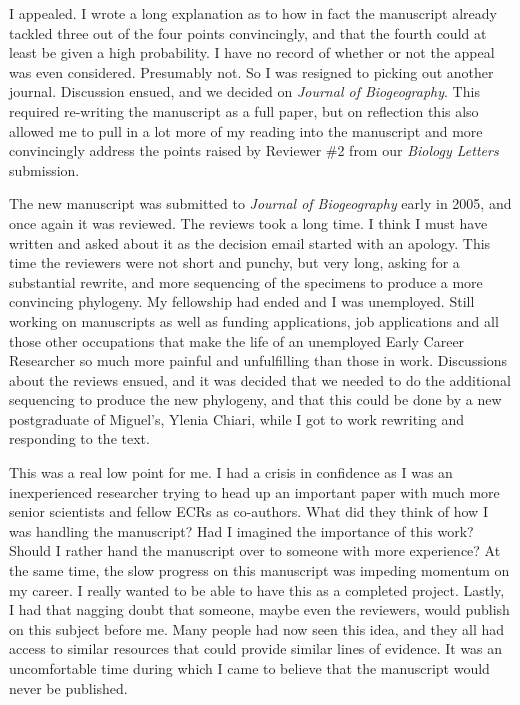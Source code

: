 \documentclass[
]{krantz}
\begin{document}
I appealed. I wrote a long explanation as to how in fact the manuscript already tackled three out of the four points convincingly, and that the fourth could at least be given a high probability. I have no record of whether or not the appeal was even considered. Presumably not. So I was resigned to picking out another journal. Discussion ensued, and we decided on \emph{Journal of Biogeography}. This required re-writing the manuscript as a full paper, but on reflection this also allowed me to pull in a lot more of my reading into the manuscript and more convincingly address the points raised by Reviewer \#2 from our \emph{Biology Letters} submission.

The new manuscript was submitted to \emph{Journal of Biogeography} early in 2005, and once again it was reviewed. The reviews took a long time. I think I must have written and asked about it as the decision email started with an apology. This time the reviewers were not short and punchy, but very long, asking for a substantial rewrite, and more sequencing of the specimens to produce a more convincing phylogeny. My fellowship had ended and I was unemployed. Still working on manuscripts as well as funding applications, job applications and all those other occupations that make the life of an unemployed Early Career Researcher so much more painful and unfulfilling than those in work. Discussions about the reviews ensued, and it was decided that we needed to do the additional sequencing to produce the new phylogeny, and that this could be done by a new postgraduate of Miguel's, Ylenia Chiari, while I got to work rewriting and responding to the text.

This was a real low point for me. I had a crisis in confidence as I was an inexperienced researcher trying to head up an important paper with much more senior scientists and fellow ECRs as co-authors. What did they think of how I was handling the manuscript? Had I imagined the importance of this work? Should I rather hand the manuscript over to someone with more experience? At the same time, the slow progress on this manuscript was impeding momentum on my career. I really wanted to be able to have this as a completed project. Lastly, I had that nagging doubt that someone, maybe even the reviewers, would publish on this subject before me. Many people had now seen this idea, and they all had access to similar resources that could provide similar lines of evidence. It was an uncomfortable time during which I came to believe that the manuscript would never be published.
\end{document}
